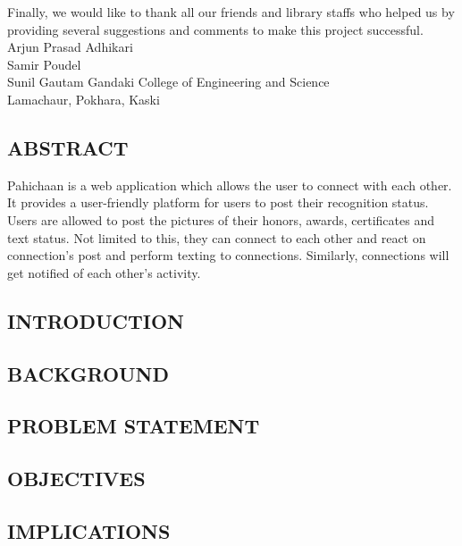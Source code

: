 \documentclass[a4paper, 14pt]{report}
\begin{document}
\begin{description}
Finally, we would like to thank all our friends and library staffs who helped
us by providing several suggestions and comments to make this project
successful.\\

Arjun Prasad Adhikari\\
Samir Poudel\\
Sunil Gautam
\vskip0.3cm
Gandaki College of Engineering and Science\\
Lamachaur, Pokhara, Kaski


\newpage
	\begin{center}
		\section*{ABSTRACT}
	\end{center}
	Pahichaan is a web application which allows the user to connect with each
other. It provides a user-friendly platform for users to post their recognition
status. Users are allowed to post the pictures of their honors, awards,
certificates and text status. Not limited to this, they can connect to each
other and react on connection’s post and perform texting to connections.
Similarly, connections will get notified of each other’s activity.\\



	\newpage
	\tableofcontents
	
	\newpage
	\listoffigures
	
	
	
	
	
	\begin{center}
		\chapter{INTRODUCTION}
	\end{center}
	
	\section{BACKGROUND}
	\section{PROBLEM STATEMENT}
	\section{OBJECTIVES}
	\section{IMPLICATIONS}
	

\end{description}
\end{document}
